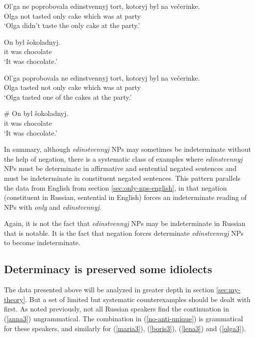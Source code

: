 \begin{exe}
	\ex \begin{xlist}
		\ex \gll Ol'ga ne poprobovala edinstvennyj tort, kotoryj byl na ve\v{c}erinke.\\
		Olga not tasted only cake which was at party\\
		\glt `Olga didn't taste the only cake at the party.'

		\ex \gll On byl \v{s}okoladnyj.\\
		it was chocolate\\
		\glt `It was chocolate.'
	\end{xlist}

	\ex \label{olga3} \begin{xlist}
		\ex \gll Ol'ga poprobovala ne edinstvennyj tort, kotoryj byl na ve\v{c}erinke.\\
		Olga tasted not only cake which was at party\\
		\glt `Olga tasted one of the cakes at the party.'

		\ex \gll \# On byl \v{s}okoladnyj.\\
		{} it was chocolate\\
		\glt `It was chocolate.'
	\end{xlist}
\end{exe}

In summary, although \textit{edinstvennyj} NPs may sometimes be indeterminate without the help of negation, there is a systematic class of examples where \textit{edinstvennyj} NPs must be determinate in affirmative and sentential negated sentences and must be indeterminate in constituent negated sentences. This pattern parallels the data from English from section \ref{sec:only-nps-english}, in that negation (constituent in Russian, sentential in English) forces an indeterminate reading of NPs with \textit{only} and \textit{edinstvennyj}.

Again, it is not the fact that \textit{edinstvennyj} NPs may be indeterminate in Russian that is notable. It is the fact that negation forces determinate \textit{edinstvennyj} NPs to become indeterminate.


\subsection{Determinacy is preserved some idiolects\label{sec:no-anti-unique}}
The data presented above will be analyzed in greater depth in section \ref{sec:my-theory}. But a set of limited but systematic counterexamples should be dealt with first. As noted previously, not all Russian speakers find the continuation in (\ref{anna3}) ungrammatical. The combination in (\ref{no-anti-unique}) is grammatical for these speakers, and similarly for (\ref{maria3}), (\ref{boris3}), (\ref{lena3}) and (\ref{olga3}).

